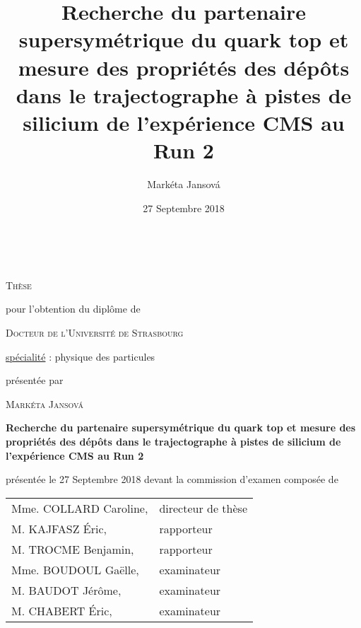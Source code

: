 
\title{Recherche du partenaire supersymétrique du quark top et mesure des propriétés des dépôts dans le trajectographe à pistes de silicium de l’expérience CMS au Run 2}
\author{Mark\'{e}ta Jansov\'{a}}
\date{27 Septembre 2018}



\begin{titlepage}
    \vspace*{1cm}
    \begin{center}
        \\

        \vspace*{0.8cm}

        {\Large \textsc{Thèse}}

        \vspace*{0.8cm}

        pour l'obtention du diplôme de

        \vspace*{0.8cm}

        {\Large \textsc{Docteur de l'Université de Strasbourg}}

        \vspace*{0.8cm}

        \underline{spécialité} : physique des particules

        \vspace*{0.8cm}

        présentée par

        \textsc{Mark\'{e}ta Jansov\'{a}}

        \vspace*{0.8cm}

        {\Large \textbf{Recherche du partenaire supersymétrique du quark top et mesure des propriétés des dépôts dans le trajectographe à pistes de silicium de l’expérience CMS au Run 2}} %

        \vspace*{0.8cm}

        présentée le 27 Septembre 2018 devant la commission d'examen composée de

        \vspace*{0.8cm}

        \begin{tabular}{ll}
            Mme. COLLARD Caroline,          & directeur de thèse\\
            M. KAJFASZ Éric,                & rapporteur\\
            M. TROCME Benjamin,             & rapporteur \\
            Mme. BOUDOUL Gaëlle,            & examinateur\\
            M. BAUDOT Jérôme,               & examinateur\\
            M. CHABERT Éric,                & examinateur\\
        \end{tabular}


\end{center}
\end{titlepage}

